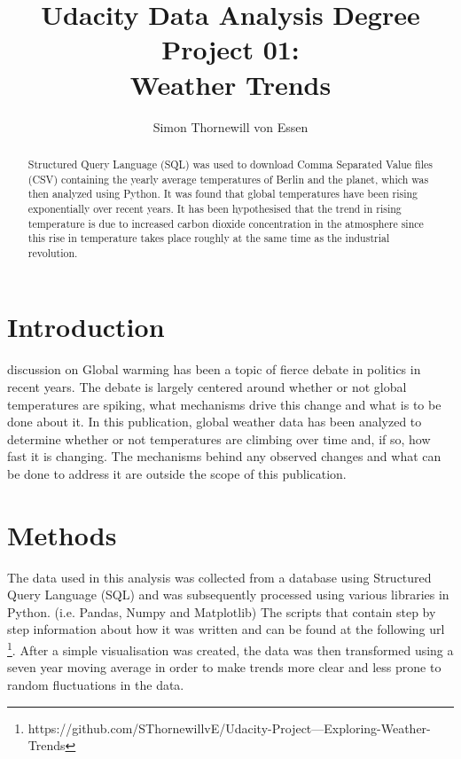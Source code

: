 \documentclass[journal, a4paper]{IEEEtran}
\begin{document}
	\title{Udacity Data Analysis Degree Project 01: \\ Weather Trends}
	\author{Simon Thornewill von Essen}
	\maketitle

\begin{abstract}
	Structured Query Language (SQL)  was used to download Comma Separated Value files (CSV) containing the yearly average temperatures of Berlin and the planet, which was then analyzed using Python. It was found that global temperatures have been rising exponentially over recent years. It has been hypothesised that the trend in rising temperature is due to increased carbon dioxide concentration in the atmosphere since this rise in temperature takes place roughly at the same time as the industrial revolution.
\end{abstract}

\section{Introduction}
	 discussion on Global warming has been a topic of fierce debate in politics in recent years. The debate is largely centered around whether or not global temperatures are spiking, what mechanisms drive this change and what is to be done about it. In this publication, global weather data has been analyzed to determine whether or not temperatures are climbing over time and, if so, how fast it is changing. The mechanisms behind any observed changes and what can be done to address it are outside the scope of this publication.
    
	\section{Methods}    
    
    The data used in this analysis was collected from a database using Structured Query Language (SQL) and was subsequently processed using various libraries in Python. (i.e. Pandas, Numpy and Matplotlib) The scripts that contain step by step information about how it was written and can be found at the following url \footnote{https://github.com/SThornewillvE/Udacity-Project---Exploring-Weather-Trends}. After a simple visualisation was created, the data was then transformed using a seven year moving average in order to make trends more clear and less prone to random fluctuations in the data.
    
\end{document}
